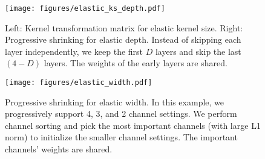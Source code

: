 \documentclass{article} \usepackage{iclr2020_conference,times}
\begin{document}
\begin{figure}[t]
    \centering
    \texttt{[image: figures/elastic\_ks\_depth.pdf]}
    \caption{Left: Kernel transformation matrix for elastic kernel size. Right: Progressive shrinking for elastic depth. Instead of skipping each layer independently, we keep the first $D$ layers and skip the last $(4 - D)$ layers. The weights of the early layers are shared.}\label{fig:elastic_ks_depth}
\end{figure}

\begin{figure}[t]
    \centering
    \texttt{[image: figures/elastic\_width.pdf]}
    \caption{Progressive shrinking for elastic width. In this example, we progressively support 4, 3, and 2 channel settings. We perform channel sorting and pick the most important channels (with large L1 norm) to initialize the smaller channel settings. The important channels' weights are shared.}\label{fig:elastic_width}
\end{figure}
\end{document}

